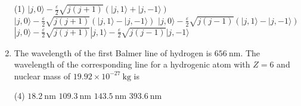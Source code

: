 \begin{enumerate}
 \begin{tasks}(1)
	\task[\textbf{a.}]$|j, 0\rangle-\frac{\varepsilon}{2} \sqrt{j(j+1)}(|j, 1\rangle+|j,-1\rangle)$
	\task[\textbf{b.}] $|j, 0\rangle-\frac{\varepsilon}{2} \sqrt{j(j+1)}(|j, 1\rangle-|j,-1\rangle)$
	\task[\textbf{c.}]$|j, 0\rangle-\frac{\varepsilon}{2} \sqrt{j(j-1)}(|j, 1\rangle-|j,-1\rangle)$
	\task[\textbf{d.}] $|j, 0\rangle-\frac{\varepsilon}{2} \sqrt{j(j+1)}|j, 1\rangle-\frac{\varepsilon}{2} \sqrt{j(j-1)}|j,-1\rangle$	
\end{tasks}
\item  The wavelength of the first Balmer line of hydrogen is $656 \mathrm{~nm}$. The wavelength of the corresponding line for a hydrogenic atom with $Z=6$ and nuclear mass of $19.92 \times 10^{-27} \mathrm{~kg}$ is
 \begin{tasks}(4)
	\task[\textbf{a.}] $18.2 \mathrm{~nm}$
	\task[\textbf{b.}]$109.3 \mathrm{~nm}$
	\task[\textbf{c.}]$143.5 \mathrm{~nm}$
	\task[\textbf{d.}]  $393.6 \mathrm{~nm}$
\end{tasks}	

\end{enumerate}
